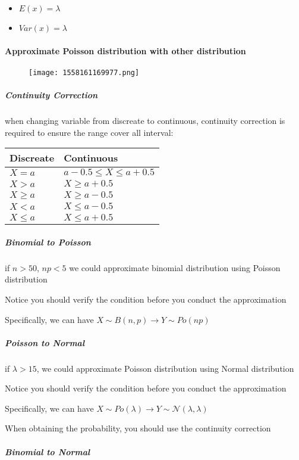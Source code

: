 \documentclass[]{article}
\let\oldparagraph\paragraph
\renewcommand{\paragraph}[1]{\oldparagraph{#1}\mbox{}}
\let\oldsubparagraph\subparagraph
\renewcommand{\subparagraph}[1]{\oldsubparagraph{#1}\mbox{}}
\begin{document}
\begin{itemize}
\item
  \(E(x) = \lambda\)
\item
  \(Var(x) = \lambda\)
\end{itemize}

\paragraph{Approximate Poisson distribution with other
distribution}\label{header-n70}

\begin{figure}
\centering
\texttt{[image: 1558161169977.png]}
\caption{}\label{mermaid}
\end{figure}

\subparagraph{Continuity Correction}\label{header-n72}

when changing variable from discreate to continuous, continuity
correction is required to ensure the range cover all interval:

\begin{longtable}[]{@{}ll@{}}
\toprule
Discreate & Continuous\tabularnewline
\midrule
\endhead
\(X=a\) & \(a-0.5 \le X \le a+0.5\)\tabularnewline
\(X>a\) & \(X\ge a+0.5\)\tabularnewline
\(X \ge a\) & \(X \ge a-0.5\)\tabularnewline
\(X<a\) & \(X\le a-0.5\)\tabularnewline
\(X \le a\) & \(X \le a+0.5\)\tabularnewline
\bottomrule
\end{longtable}

\subparagraph{Binomial to Poisson}\label{header-n93}

if \(n>50\), \(np<5\) we could approximate binomial distribution using
Poisson distribution

Notice you should verify the condition before you conduct the
approximation

Specifically, we can have \(X \sim B(n,p) \rightarrow Y \sim Po(np)\)

\subparagraph{Poisson to Normal}\label{header-n97}

if \(\lambda > 15\), we could approximate Poisson distribution using
Normal distribution

Notice you should verify the condition before you conduct the
approximation

Specifically, we can have
\(X \sim Po(\lambda) \rightarrow Y \sim \mathcal{N}(\lambda,\lambda)\)

When obtaining the probability, you should use the continuity correction

\subparagraph{Binomial to Normal}\label{header-n102}
\end{document}
